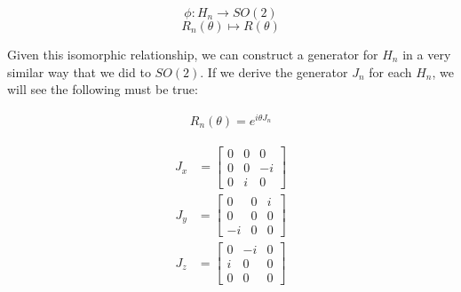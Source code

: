 $$\phi:H_n \rightarrow SO(2)$$
$$R_n(\theta) \mapsto R(\theta)$$

Given this isomorphic relationship, we can construct a generator for $H_n$ in a very similar way that we did to $SO(2)$. If we derive the generator $J_n$ for each $H_n$, we will see the following must be true:

\begin{equation}
	\begin{aligned}
		R_n(\theta) = e^{i\theta J_n}
	\end{aligned}
\end{equation}

\begin{equation}
	\begin{aligned}
		J_x &= \begin{bmatrix}
					0 & 0 & 0 \\
					0 & 0 & -i \\
					0 & i & 0
					\end{bmatrix}
	\end{aligned}
\end{equation}
\begin{equation}
	\begin{aligned}
		J_y &= \begin{bmatrix}
					0 & 0 & i \\
					0 & 0 & 0 \\
					-i & 0 & 0
					\end{bmatrix}
	\end{aligned}
\end{equation}
\begin{equation}
	\begin{aligned}
		J_z &= \begin{bmatrix}
					0 & -i & 0 \\
					i & 0 & 0 \\
					0 & 0 & 0
					\end{bmatrix}
	\end{aligned}
\end{equation}


